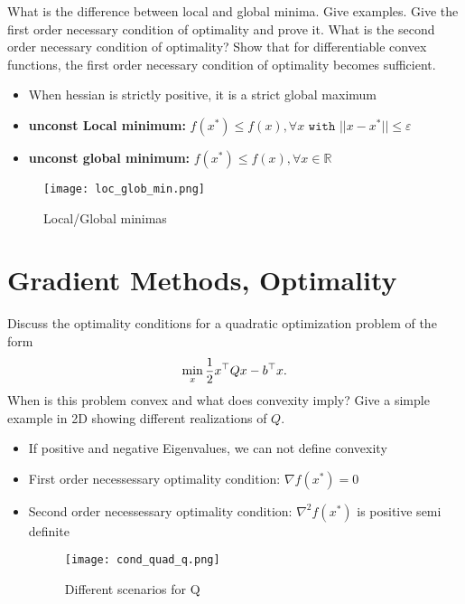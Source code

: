 \documentclass{article}
\begin{document}
\begin{question}
  What is the difference between local and global minima. Give examples.  Give the first order
  necessary condition of optimality and prove it. What is the second order necessary condition of
  optimality? Show that for differentiable convex functions, the first order necessary condition of
  optimality becomes sufficient.
\end{question}
\begin{itemize}
\item When hessian is strictly positive, it is a strict global maximum
\item \textbf{unconst Local minimum:}
  $f(x^*) \leq f(x), \forall x \texttt{ with } || x - x^* || \leq \varepsilon$
\item \textbf{unconst global minimum:} $f(x^*) \leq f(x), \forall x \in \mathbb{R}$
\end{itemize}

\begin{figure}[H]
  \texttt{[image: loc\_glob\_min.png]}
  \caption{Local/Global minimas\label{fig:min}}
\end{figure}

\section{Gradient Methods, Optimality}

\begin{question}
  Discuss the optimality conditions for a quadratic optimization problem of the form
  \[ \min_x \frac{1}{2} x^{\top} Q x - b^{\top} x.
  \]
  When is this problem convex and what does convexity imply? Give a simple example in 2D showing
  different realizations of \(Q\).
\end{question}
\begin{itemize}
\item If positive and negative Eigenvalues, we can not define convexity
\item First order necessessary optimality condition: $\nabla f(x^*) = 0$
\item Second order necessessary optimality condition: $\nabla^2 f(x^*) $ is positive semi definite

  \begin{figure}[H]
    \texttt{[image: cond\_quad\_q.png]}
    \caption{Different scenarios for Q\label{fig:cond_quad}}
  \end{figure}	
\end{itemize}
\end{document}
